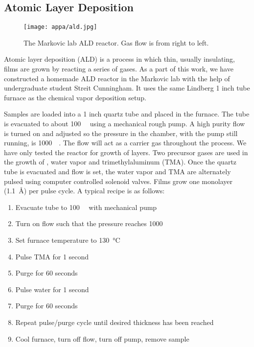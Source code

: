 \subsection{Atomic Layer Deposition}
\label{subsec:ald}

\begin{figure}
	\centering
	\texttt{[image: appa/ald.jpg]}
	\caption{The Markovic lab ALD reactor. Gas flow is from right to left.} 
	\label{fig:ald}
\end{figure}

Atomic layer deposition (ALD) is a process in which thin, usually insulating, films are grown by reacting a series of gases. As a part of this work, we have constructed a homemade ALD reactor in the Markovic lab with the help of undergraduate student Streit Cunningham. It uses the same Lindberg 1 inch tube furnace as the chemical vapor deposition setup.

Samples are loaded into a 1 inch quartz tube and placed in the furnace. The tube is evacuated to about \SI{100}{\milli\torr} using a mechanical rough pump. A high purity  flow is turned on and adjusted so the pressure in the chamber, with the pump still running, is \SI{1000}{\milli\torr}. The  flow will act as a carrier gas throughout the process. We have only tested the reactor for growth of  layers. Two precursor gases are used in the growth of , water vapor and trimethylaluminum (TMA). Once the quartz tube is evacuated and  flow is set, the water vapor and TMA are alternately pulsed using computer controlled solenoid valves. Films grow one monolayer (\SI{1.1}{\angstrom}) per pulse cycle. A typical recipe is as follows:

\begin{enumerate}
\item Evacuate tube to \SI{100}{\milli\torr} with mechanical pump
\item Turn on  flow such that the pressure reaches \SI{1000}{\milli\torr}
\item Set furnace temperature to \SI{130}{\degreeCelsius}
\item Pulse TMA for 1 second
\item Purge for 60 seconds
\item Pulse water for 1 second
\item Purge for 60 seconds
\item Repeat pulse\slash purge cycle until desired thickness has been reached
\item Cool furnace, turn off  flow, turn off pump, remove sample
\end{enumerate}


